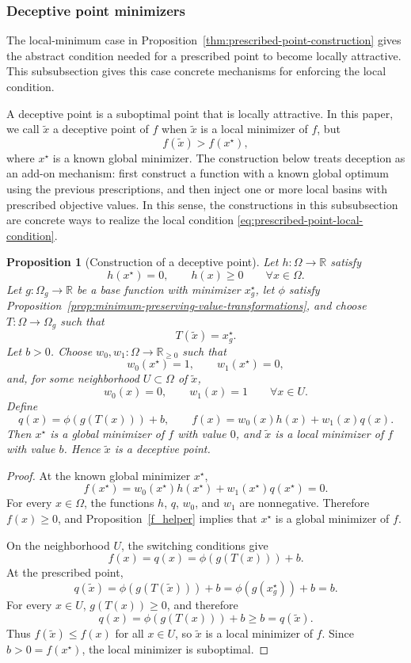 \documentclass[11pt,a4paper]{article}
\theoremstyle{remark}
\theoremstyle{plain}
\newtheorem{proposition}{Proposition}
\begin{document}
\subsubsection{Deceptive point minimizers}

The local-minimum case in
Proposition~\ref{thm:prescribed-point-construction} gives the abstract
condition needed for a prescribed point to become locally attractive. This
subsubsection gives this case concrete mechanisms for enforcing the local condition.

A deceptive point is a suboptimal point that is locally attractive. In this
paper, we call \(\tilde x\) a deceptive point of \(f\) when \(\tilde x\) is a
local minimizer of \(f\), but
\[
	f(\tilde x)>f(x^\star),
\]
where \(x^\star\) is a known global minimizer. The construction below treats
deception as an add-on mechanism: first construct a function with a known global
optimum using the previous prescriptions, and then inject one or more local
basins with prescribed objective values. In this sense, the constructions in
this subsubsection are concrete ways to realize the local condition
\eqref{eq:prescribed-point-local-condition}.

\begin{proposition}[Construction of a deceptive point]
	\label{prop:add-on-deceptive-point}
	Let \(h:\Omega\to\mathbb{R}\) satisfy
	\[
	h(x^\star)=0,
	\qquad
	h(x)\ge0
	\qquad
	\forall x\in\Omega.
	\]
	Let \(g:\Omega_g\to\mathbb{R}\) be a base function with minimizer
	\(x_g^\star\), let \(\phi\) satisfy
	Proposition~\ref{prop:minimum-preserving-value-transformations}, and choose
	\(T:\Omega\to\Omega_g\) such that
	\[
	T(\tilde x)=x_g^\star.
	\]
	Let \(b>0\). Choose \(w_0,w_1:\Omega\to\mathbb{R}_{\ge0}\) such that
	\[
	w_0(x^\star)=1,
	\qquad
	w_1(x^\star)=0,
	\]
	and, for some neighborhood \(U\subset\Omega\) of \(\tilde x\),
	\[
	w_0(x)=0,
	\qquad
	w_1(x)=1
	\qquad
	\forall x\in U.
	\]
	Define
	\[
	q(x)=\phi(g(T(x)))+b,
	\qquad
	f(x)=w_0(x)h(x)+w_1(x)q(x).
	\]
	Then \(x^\star\) is a global minimizer of \(f\) with value \(0\), and
	\(\tilde x\) is a local minimizer of \(f\) with value \(b\). Hence
	\(\tilde x\) is a deceptive point.
\end{proposition}

\begin{proof}
	At the known global minimizer \(x^\star\),
	\[
	f(x^\star)
	=
	w_0(x^\star)h(x^\star)+w_1(x^\star)q(x^\star)
	=
	0.
	\]
	For every \(x\in\Omega\), the functions \(h\), \(q\), \(w_0\), and \(w_1\)
	are nonnegative. Therefore \(f(x)\ge0\), and
	Proposition~\ref{f_helper} implies that \(x^\star\) is a global minimizer of
	\(f\).
	
	On the neighborhood \(U\), the switching conditions give
	\[
	f(x)=q(x)=\phi(g(T(x)))+b.
	\]
	At the prescribed point,
	\[
	q(\tilde x)
	=
	\phi(g(T(\tilde x)))+b
	=
	\phi(g(x_g^\star))+b
	=
	b.
	\]
	For every \(x\in U\), \(g(T(x))\ge0\), and therefore
	\[
	q(x)=\phi(g(T(x)))+b\ge b=q(\tilde x).
	\]
	Thus \(f(\tilde x)\le f(x)\) for all \(x\in U\), so \(\tilde x\) is a local
	minimizer of \(f\). Since \(b>0=f(x^\star)\), the local minimizer is
	suboptimal.
\end{proof}
\end{document}
